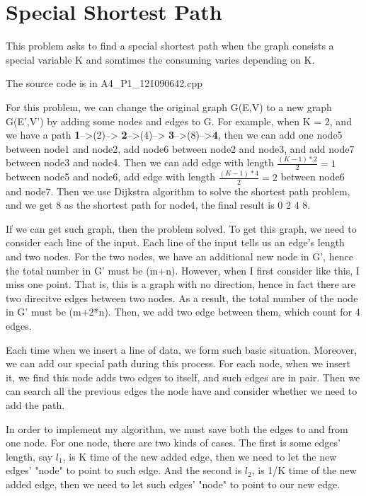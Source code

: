 

\section{Special Shortest Path}
This problem asks to find a special shortest path when the graph consists a special variable K and somtimes the consuming varies depending on K. 

The source code is in A4\_P1\_121090642.cpp

For this problem, we can change the original graph G(E,V) to a new graph G(E',V') by adding some nodes and edges to G. For example, when K = 2, and we have a path \textbf{1}-->(2)--> \textbf{2}-->(4)--> \textbf{3}-->(8)-->\textbf{4}, then we can add one node5 between node1 and node2, add node6 between node2 and node3, and add node7 between node3 and node4. Then we can add edge with length $\frac{(K-1)*2}{2}=1$ between node5 and node6, add edge with length $\frac{(K-1)*4}{2}=2$ between node6 and node7. Then we use Dijkstra algorithm to solve the shortest path problem, and we get 8 as the shortest path for node4, the final result is 0 2 4 8.

If we can get such graph, then the problem solved. To get this graph, we need to consider each line of the input. Each line of the input tells us an edge's length and two nodes. For the two nodes, we have an additional new node in G', hence the total number in G' must be (m+n). However, when I first consider like this, I miss one point. That is, this is a graph with no direction, hence in fact there are two direcitve edges between two nodes. As a result, the total number of the node in G' must be (m+2*n). Then, we add two edge between them, which count for 4 edges.

Each time when we insert a line of data, we form such basic situation. Moreover, we can add our special path during this process. For each node, when we insert it, we find this node adds two edges to itself, and such edges are in pair. Then we can search all the previous edges the node have and consider whether we need to add the path.

In order to implement my algorithm, we must save both the edges to and from one node. For one node, there are two kinds of cases. The first is some edges' length, say $l_1$, is K time of the new added edge, then we need to let the new edges' "node" to point to such edge. And the second is $l_2$, is 1/K time of the new added edge, then we need to let such edges' "node" to point to our new edge.

